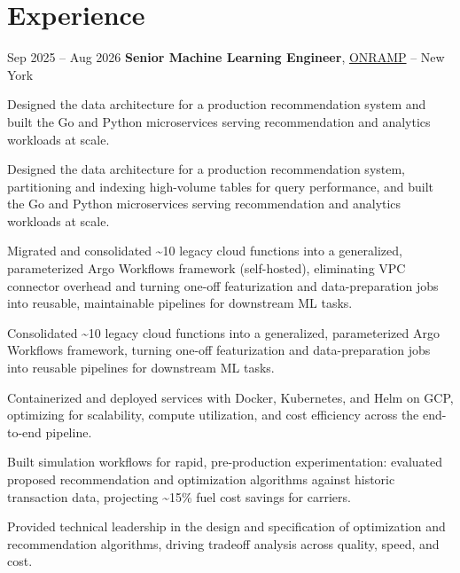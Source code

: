    \section{Experience}

        \begin{twocolentry}{
            Sep 2025 – Aug 2026
        }
            \textbf{Senior Machine Learning Engineer}, \href{https://onrampfleet.com/}{ONRAMP} -- New York\end{twocolentry}
        \vspace{0.06 cm}
        \begin{onecolentry}
            \begin{highlights}
                \item Designed the data architecture for a production recommendation system and built the Go and Python microservices serving recommendation and analytics workloads at scale.
                \item Designed the data architecture for a production recommendation system, partitioning and indexing high-volume tables for query performance, and built the Go and Python microservices serving recommendation and analytics workloads at scale.
                \item Migrated and consolidated \textasciitilde10 legacy cloud functions into a generalized, parameterized Argo Workflows framework (self-hosted), eliminating VPC connector overhead and turning one-off featurization and data-preparation jobs into reusable, maintainable pipelines for downstream ML tasks.
                \item Consolidated \textasciitilde10 legacy cloud functions into a generalized, parameterized Argo Workflows framework, turning one-off featurization and data-preparation jobs into reusable pipelines for downstream ML tasks.
                \item Containerized and deployed services with Docker, Kubernetes, and Helm on GCP, optimizing for scalability, compute utilization, and cost efficiency across the end-to-end pipeline.
                \item Built simulation workflows for rapid, pre-production experimentation: evaluated proposed recommendation and optimization algorithms against historic transaction data, projecting \textasciitilde15\% fuel cost savings for carriers.
                \item Provided technical leadership in the design and specification of optimization and recommendation algorithms, driving tradeoff analysis across quality, speed, and cost.
            \end{highlights}
        \end{onecolentry}

